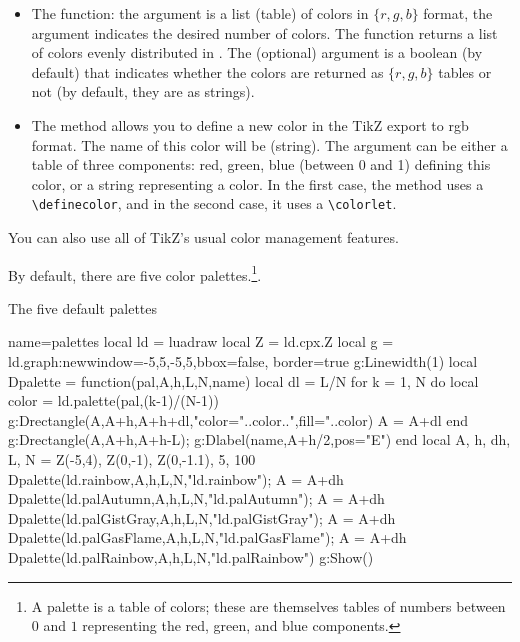 \begin{itemize}
    \item The  function: the  argument is a list (table) of colors in $\{r,g,b\}$ format, the  argument indicates the desired number of colors. The function returns a list of  colors evenly distributed in . The (optional)  argument is a boolean (\false by default) that indicates whether the colors are returned as $\{r,g,b\}$ tables or not (by default, they are as strings).

    \item The method  allows you to define a new color in the TikZ export to rgb format. The name of this color will be  (string). The argument  can be either a table of three components: red, green, blue (between 0 and 1) defining this color, or a string representing a color. In the first case, the method uses a \verb|\definecolor|, and in the second case, it uses a \verb|\colorlet|.

\end{itemize}
You can also use all of TikZ's usual color management features.

By default, there are five color palettes.\footnote{A palette is a table of colors; these are themselves tables of numbers between $0$ and $1$ representing the red, green, and blue components.}.

\begin{demo}{The five default palettes}
\begin{luadraw}{name=palettes}
local ld = luadraw
local Z = ld.cpx.Z
local g = ld.graph:new{window={-5,5,-5,5},bbox=false, border=true}
g:Linewidth(1)
local Dpalette = function(pal,A,h,L,N,name)
    local dl = L/N
    for k = 1, N do
        local color = ld.palette(pal,(k-1)/(N-1))
        g:Drectangle(A,A+h,A+h+dl,"color="..color..",fill="..color)
        A = A+dl
    end
    g:Drectangle(A,A+h,A+h-L); g:Dlabel(name,A+h/2,{pos="E"})
end
local A, h, dh, L, N = Z(-5,4), Z(0,-1), Z(0,-1.1), 5, 100
Dpalette(ld.rainbow,A,h,L,N,"ld.rainbow"); A = A+dh
Dpalette(ld.palAutumn,A,h,L,N,"ld.palAutumn"); A = A+dh
Dpalette(ld.palGistGray,A,h,L,N,"ld.palGistGray"); A = A+dh
Dpalette(ld.palGasFlame,A,h,L,N,"ld.palGasFlame"); A = A+dh
Dpalette(ld.palRainbow,A,h,L,N,"ld.palRainbow")
g:Show()
\end{luadraw}
\end{demo}
